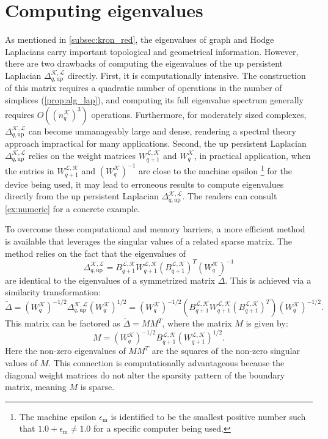 \documentclass{article}
\theoremstyle{definition}
\newcommand{\KK}{\mathcal{K}}
\newcommand{\LL}{\mathcal{L}}
\newcommand{\epsmach}{\epsilon_{\text{m}}}
\begin{document}
\section{Computing eigenvalues}
\label{sec:eigenvalues}
As mentioned in \cref{subsec:kron_red}, the eigenvalues of graph and Hodge Laplacians carry important topological and geometrical information. 
However, 
there are two drawbacks of computing the eigenvalues of the up persistent Laplacian $\Delta_{q, \text{up}}^{\KK, \LL}$ directly.
First,
it is computationally intensive. 
The construction of this matrix requires a quadratic number of operations in the number of simplices (\cref{prop:alg_lap}), and computing its full eigenvalue spectrum generally requires $O\left((n_q^{\KK})^3\right)$ operations. Furthermore, for moderately sized complexes, $\Delta_{q, \text{up}}^{\KK, \LL}$ can become unmanageably large and dense, rendering a spectral theory approach impractical for many applications. 
Second,
the up persistent Laplacian $\Delta_{q, \text{up}}^{\KK, \LL}$ relies on the weight matrices $W_{q+1}^{\LL, \KK}$ and $W_q^\KK$,
in practical application,
when the entries in $W_{q+1}^{\LL, \KK}$ and $(W_{q}^\KK)^{-1}$ are close to the machine epsilon
\footnote{The machine epsilon $\epsmach$ is identified to be the smallest positive number such that $1.0 + \epsmach\neq 1.0$ for a specific computer being used.}
for the device being used,
it may lead to erroneous results to compute eigenvalues directly from the up persistent Laplacian $\Delta_{q, \text{up}}^{\KK, \LL}$.
The readers can consult \cref{ex:numeric} for a concrete example. 


To overcome these computational and memory barriers, a more efficient method is available that leverages the singular values of a related sparse matrix.
The method relies on the fact that the eigenvalues of
\[
    \Delta_{q, \text{up}}^{\KK, \LL} = B_{q+1}^{\LL, \KK} W_{q+1}^{\LL, \KK}\left(B_{q+1}^{\LL, \KK}\right)^{T}(W_{q}^\KK)^{-1}
\]
are identical to the eigenvalues of a symmetrized matrix $\tilde{\Delta}$. This is achieved via a similarity transformation:
$$ 
    \tilde{\Delta} = (W_q^{\KK})^{-1/2}\Delta_{q, \mathrm{up}}^{\KK, \LL}(W_q^{\KK})^{1/2} = (W_q^{\KK})^{-1/2} \left(B_{q+1}^{\LL, \KK} W_{q+1}^{\LL, \KK}\left(B_{q+1}^{\LL, \KK}\right)^{T}\right) (W_q^{\KK})^{-1/2}.
$$
This matrix can be factored as $\tilde{\Delta} = M M^T$, where the matrix $M$ is given by:
$$ 
    M = (W_q^{\KK})^{-1/2}B_{q+1}^{\LL, \KK} (W_{q+1}^{\LL, \KK})^{1/2}.
$$
Here the non-zero eigenvalues of $M M^T$ are the squares of the non-zero singular values of $M$.  This connection is computationally advantageous because the diagonal weight matrices do not alter the sparsity pattern of the boundary matrix, meaning $M$ is sparse.
\end{document}
